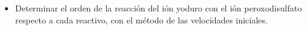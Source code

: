 \documentclass[../main]{subfiles}
\begin{document}
\begin{itemize}
  \item Determinar el orden de la reacción del ión yoduro  con el ión peroxodisulfato  respecto a cada reactivo, con el método de las velocidades iniciales.
\end{itemize}
\end{document}

